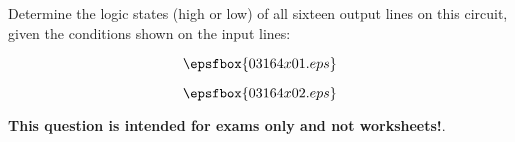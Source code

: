 

Determine the logic states (high or low) of all sixteen output lines on this circuit, given the conditions shown on the input lines:

$$\epsfbox{03164x01.eps}$$







$$\epsfbox{03164x02.eps}$$







{\bf This question is intended for exams only and not worksheets!}.




